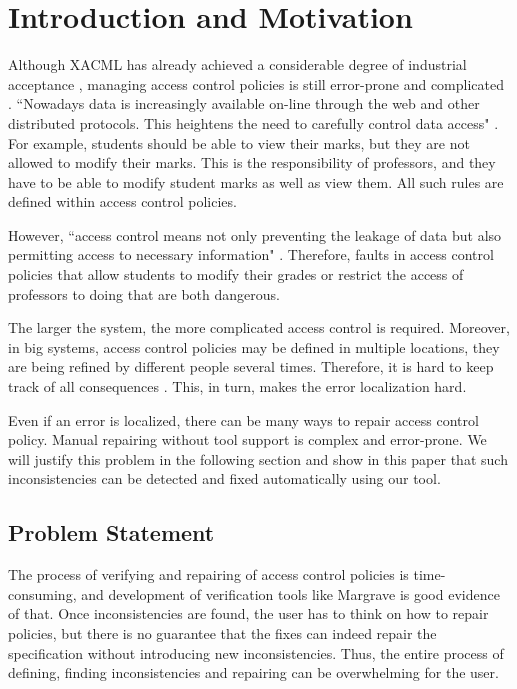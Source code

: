 \documentclass[letterpaper]{acm_proc_article-sp}
\begin{document}


\section{Introduction and Motivation}

Although XACML has already achieved a considerable degree of industrial acceptance \cite{acp:alloy}, managing access control policies is still error-prone and complicated \cite{acp:automated}. ``Nowadays data is increasingly available on-line through the web and other distributed protocols. This heightens the need to carefully control data access" \cite{Fisler:2005:VCA:1062455.1062502}. For example, students should be able to view their marks, but they are not allowed to modify their marks. This is the responsibility of professors, and they have to be able to modify student marks as well as view them. All such rules are defined within access control policies.

However, ``access control means not only preventing the leakage of data but also permitting access to necessary information" \cite{Fisler:2005:VCA:1062455.1062502}. Therefore, faults in access control policies that allow students to modify their grades or restrict the access of professors to doing that are both dangerous.

The larger the system, the more complicated access control is required. Moreover, in big systems, access control policies may be defined in multiple locations, they are being refined by different people several times. Therefore, it is hard to keep track of all consequences \cite{Fisler:2005:VCA:1062455.1062502}. This, in turn, makes the error localization hard.

Even if an error is localized, there can be many ways to repair access control policy. Manual repairing without tool support is complex and error-prone. We will justify this problem in the following section and show in this paper that such inconsistencies can be detected and fixed automatically using our tool.

\subsection{Problem Statement}

The process of verifying and repairing of access control policies is time-consuming, and development of verification tools like Margrave \cite{Fisler:2005:VCA:1062455.1062502} is good evidence of that. Once inconsistencies are found, the user has to think on how to repair policies, but there is no guarantee that the fixes can indeed repair the specification without introducing new inconsistencies. Thus, the entire process of defining, finding inconsistencies and repairing can be overwhelming for the user.
\end{document}

